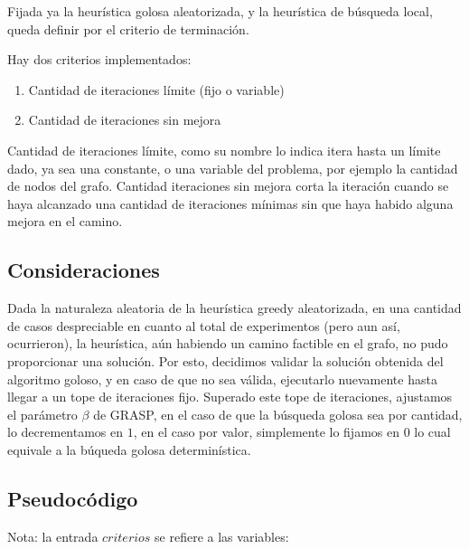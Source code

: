 Fijada ya la heur\'istica golosa aleatorizada, y la heur\'istica de b\'usqueda local, queda definir por el criterio de terminaci\'on.

\vspace{2mm}

Hay dos criterios implementados:

\begin{enumerate}
\item Cantidad de iteraciones l\'imite (fijo o variable)
\item Cantidad de iteraciones sin mejora
\end{enumerate}

Cantidad de iteraciones l\'imite, como su nombre lo indica itera hasta un l\'imite dado, ya sea una constante, o una variable del problema, por ejemplo la cantidad de nodos del grafo. Cantidad iteraciones sin mejora corta la iteraci\'on cuando se haya alcanzado una cantidad de iteraciones m\'inimas sin que haya habido alguna mejora en el camino.

\vspace{2mm}

\subsection{Consideraciones}

Dada la naturaleza aleatoria de la heur\'istica greedy aleatorizada, en una cantidad de casos despreciable en cuanto al total de experimentos (pero aun as\'i, ocurrieron), la heur\'istica, a\'un habiendo un camino factible en el grafo, no pudo proporcionar una soluci\'on. Por esto, decidimos validar la soluci\'on obtenida del algoritmo goloso, y en caso de que no sea v\'alida, ejecutarlo nuevamente hasta llegar a un tope de iteraciones fijo. Superado este tope de iteraciones, ajustamos el par\'ametro $\beta$ de GRASP, en el caso de que la b\'usqueda golosa sea por cantidad, lo decrementamos en $1$, en el caso por valor, simplemente lo fijamos en $0$ lo cual equivale a la b\'uqueda golosa determin\'istica.

\subsection{Pseudoc\'odigo}

Nota: la entrada $criterios$ se refiere a las variables:

